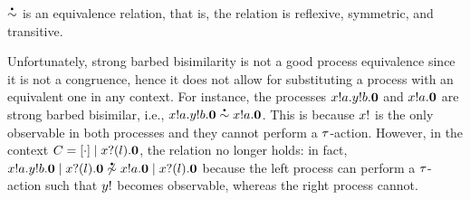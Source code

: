 \documentclass[runningheads]{llncs}
\begin{document}
\begin{theorem}
  \( \sbbisim{}{} \) is an equivalence relation, that is, the relation is reflexive, symmetric, and transitive.
\end{theorem}

Unfortunately, strong barbed bisimilarity is not a good process
equivalence since it is not a congruence, hence it does not allow for
substituting a process with an equivalent one in any context.
For instance, the processes $x ! a . y ! b . \bm{0}$ and
$x ! a . \bm{0}$ are strong barbed bisimilar, i.e.,
$\sbbisim{\Pout{x}{a}{\Pout{y}{b}{\Pend}}}{\Pout{x}{a}{\Pend}}$. This
is because \( x! \) is the only observable in both processes
and they cannot perform a \( \tau \)-action. However, in the context
$C = [\cdot] \mid x ? (l) . \bm{0}$, the relation no
longer holds: in fact,
$\nsbbisim{\Ppar{\Pout{x}{a}{\Pout{y}{b}{\Pend}}}{\Pin{x}{l}{\Pend}}}{\Pout{x}{a}{\Pend}\Ppar{}{\Pin{x}{l}{\Pend}}}$
%
because the left process can perform a \( \tau \)-action such that
\( y! \) becomes observable, whereas the right process cannot.




\end{document}
